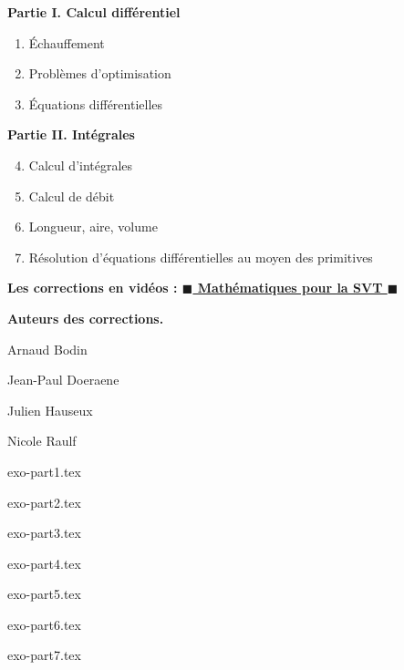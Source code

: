 \documentclass[11pt,a4paper]{report}
\begin{document}




\bigskip
\bigskip
\bigskip
\bigskip


\textbf{Partie I.  Calcul différentiel}
\begin{enumerate}[label=\arabic*.]
  \item Échauffement
  \item Problèmes d'optimisation
  \item Équations différentielles

\end{enumerate}

\bigskip

\textbf{Partie II.  Intégrales}
\begin{enumerate}[label=\arabic*.]
\setcounter{enumi}{3}
  \item Calcul d'intégrales
  \item Calcul de débit
  \item Longueur, aire, volume
  \item Résolution d'équations différentielles au moyen des primitives
\end{enumerate}

\bigskip
\bigskip
\bigskip


{\large\bf
Les corrections en vidéos : 
\href{https://www.youtube.com/channel/UCTeAx64qLOxULLcjUl9qfZg}{$\blacksquare$ Mathématiques pour la SVT $\blacksquare$}}


\vfill

\textbf{Auteurs des corrections.}

Arnaud Bodin

Jean-Paul Doeraene

Julien Hauseux

Nicole Raulf


\vspace*{2cm}

\newpage



{exo-part1.tex}

{exo-part2.tex}

{exo-part3.tex}

{exo-part4.tex}

{exo-part5.tex}

{exo-part6.tex}

{exo-part7.tex}

\end{document}
